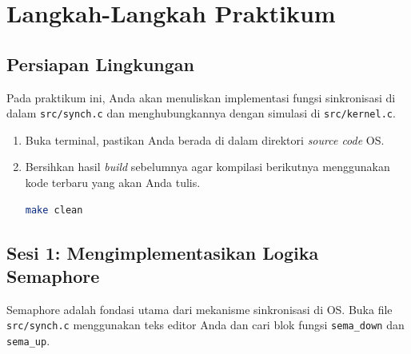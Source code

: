 \newpage
\section{Langkah-Langkah Praktikum}

\subsection{Persiapan Lingkungan}
\label{sec:m10-persiapan}

Pada praktikum ini, Anda akan menuliskan implementasi fungsi sinkronisasi di dalam \texttt{src/synch.c} dan menghubungkannya dengan simulasi di \texttt{src/kernel.c}.

\begin{enumerate}
	\item Buka terminal, pastikan Anda berada di dalam direktori \textit{source code} OS.
	\item Bersihkan hasil \textit{build} sebelumnya agar kompilasi berikutnya menggunakan kode terbaru yang akan Anda tulis.
	      \begin{lstlisting}[language=bash, caption={Bersihkan build sebelumnya}]
make clean
    \end{lstlisting}
\end{enumerate}

\subsection{Sesi 1: Mengimplementasikan Logika Semaphore}
\label{sec:m10-sesi-1}

Semaphore adalah fondasi utama dari mekanisme sinkronisasi di OS. Buka file \texttt{src/synch.c} menggunakan teks editor Anda dan cari blok fungsi \texttt{sema\_down} dan \texttt{sema\_up}.

